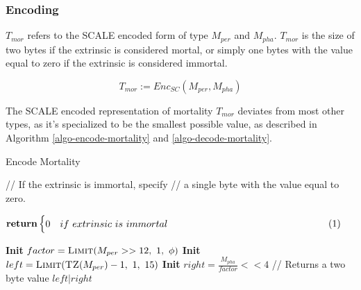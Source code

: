 \begin{definition}
    \subsubsection*{Encoding}\label{sect-mortality-encoding}

    $T_{mor}$ refers to the SCALE encoded form of type $M_{per}$ and $M_{pha}$.
    $T_{mor}$ is the size of two bytes if the extrinsic is considered mortal,
    or simply one bytes with the value equal to zero if the extrinsic is
    considered immortal.

    \[
        T_{mor} := Enc_{SC}(M_{per}, M_{pha})
    \]

    The SCALE encoded representation of mortality $T_{mor}$ deviates from most
    other types, as it's specialized to be the smallest possible value, as
    described in Algorithm \ref{algo-encode-mortality} and
    \ref{algo-decode-mortality}.

    \begin{algorithm}[H]
        \caption[]{\sc Encode Mortality}
        \label{algo-encode-mortality}
        \begin{algorithmic}[1]
            \Statex // If the extrinsic is immortal, specify
            \Statex // a single byte with the value equal to zero.
            \State $\vcenter{
                \begin{flalign*}
                    \Return & 
                    \begin{cases}
                    0 & if\ extrinsic\ is\ immortal 
                    \end{cases}&
                \end{flalign*}
            }$
            \State \textbf{Init} $factor = \textsc{Limit}(M_{per} >> 12,\ 1,\ \phi)$
            \State \textbf{Init} $left = \textsc{Limit}(\textsc{TZ}(M_{per})-1,\ 1,\ 15)$
            \State \textbf{Init} $right = \frac{M_{pha}}{factor} << 4$
            \Statex
            \Statex // Returns a two byte value
            \State \Return $left|right$
        \end{algorithmic}
    \end{algorithm}


\end{definition}
